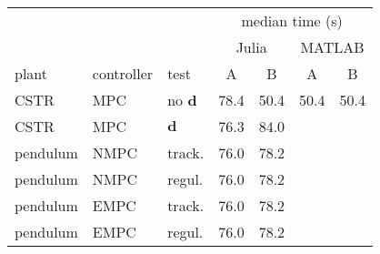 \begin{tabular}{lllcccc}
	
\toprule %

	  &	& & \multicolumn{4}{c}{median time (s)} \\ \cmidrule(l){4-7}
	  & & & \multicolumn{2}{c}{Julia} & \multicolumn{2}{c}{MATLAB}  \\ \cmidrule(lr){4-5} \cmidrule(l){6-7} 
plant & controller & test & A & B & A & B \\
\midrule %

CSTR		& MPC	& no $\mathbf{d}$  & \num{78.4} & \num{50.4} & \num{50.4} & \num{50.4} \\
CSTR		& MPC	& $\mathbf{d}$ & \num{76.3} & \num{84.0}  	\\
pendulum 	& NMPC	& track. 	& \num{76.0} & \num{78.2}  	\\
pendulum    & NMPC	& regul. 	& \num{76.0} & \num{78.2} 	\\
pendulum    & EMPC	& track.	& \num{76.0} & \num{78.2} 	\\
pendulum	& EMPC	& regul. 	& \num{76.0} & \num{78.2}  	\\
	
\bottomrule %
	
\end{tabular}
